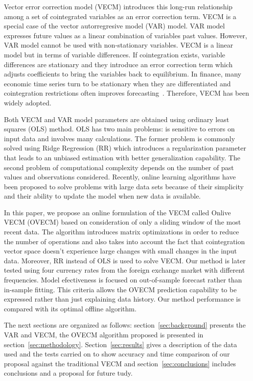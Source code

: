 Vector error correction model (VECM) introduces this long-run relationship
among a set of cointegrated variables as an error correction term. VECM is a
special case of the vector autorregresive model (VAR) model. VAR model
expresses future values as a linear combination of variables past values.
However, VAR model cannot be used with non-stationary variables. VECM is a
linear model but in terms of variable differences. If cointegration exists,
variable differences are stationary and they introduce an error correction term
which adjusts coefficients to bring the variables back to equilibrium. In
finance, many economic time series turn to be stationary when they are
differentiated and cointegration restrictions often improves
forecasting~\cite{duy1998}. Therefore, VECM has been widely adopted.

Both VECM and VAR model parameters are obtained using ordinary least squares
(OLS) method. OLS has two main problems: is sensitive to errors on input data
and involves many calculations. The former problem is commonly solved using
Ridge Regression (RR) \cite{hoerl1970} which introduces a regularization
parameter that leads to an unbiased estimation with better generalization
capability. The second problem of computational complexity depends on the number
of past values and observations considered.  Recently, online learning
algorithms have been proposed to solve problems with large data sets because of
their simplicity and their ability to update the model when new data is
available. 

In this paper, we propose an online formulation of the VECM called Onlive VECM
(OVECM) based on consideration of only a sliding window of the most recent data.
The algorithm introduces matrix optimizations in order to reduce the number of
operations and also takes into account the fact that cointegration vector space
doesn't experience large changes with small changes in the input data. Moreover,
RR instead of OLS is used to solve VECM. Our method is later tested using four
currency rates from the foreign exchange market with different frequencies.  Model
efectiveness is focused on out-of-sample forecast rather than in-sample fitting.
This criteria allows the OVECM prediction capability to be expressed rather than
just explaining data history. Our method performance is compared with its
optimal offline algorithm.


The next sections are organized as follows: section~\ref{sec:background}
presents the VAR and VECM, the OVECM algorithm proposed is presented in
section~\ref{sec:methodology}. Section~\ref{sec:results} gives a description of
the data used and the tests carried on to show accuracy and time comparison of
our proposal against the traditional VECM and
section~\ref{sec:conclusions} includes conclusions and a proposal for future
tudy.
